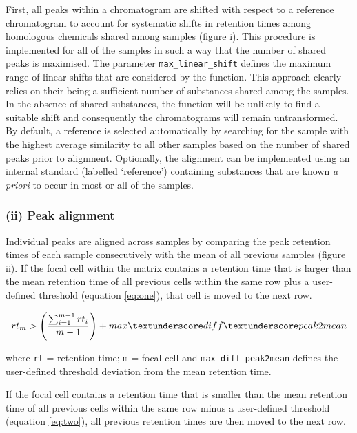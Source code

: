 First, all peaks within a chromatogram are shifted with respect to a
reference chromatogram to account for systematic shifts in retention
times among homologous chemicals shared among samples (figure
\href{figure:algorithm} i). This procedure is implemented for all of the
samples in such a way that the number of shared peaks is maximised. The
parameter \texttt{max\_linear\_shift} defines the maximum range of
linear shifts that are considered by the function. This approach clearly
relies on their being a sufficient number of substances shared among the
samples. In the absence of shared substances, the function will be
unlikely to find a suitable shift and consequently the chromatograms
will remain untransformed. By default, a reference is selected
automatically by searching for the sample with the highest average
similarity to all other samples based on the number of shared peaks
prior to alignment. Optionally, the alignment can be implemented using
an internal standard (labelled `reference') containing substances that
are known \emph{a priori} to occur in most or all of the samples.

\subsubsection{(ii) Peak alignment}\label{ii-peak-alignment}

Individual peaks are aligned across samples by comparing the peak
retention times of each sample consecutively with the mean of all
previous samples (figure \href{figure:algorithm} ii). If the focal cell
within the matrix contains a retention time that is larger than the mean
retention time of all previous cells within the same row plus a
user-defined threshold (equation \eqref{eq:one}), that cell is moved to
the next row.

\begin{equation}
\label{eq:one}
rt_{m} > \left(\frac{\sum_{i=1}^{m-1}rt_{i}}{m-1}\right) + max\textunderscore diff\textunderscore peak2mean
\end{equation}

where \texttt{rt} = retention time; \texttt{m} = focal cell and
\texttt{max\_diff\_peak2mean} defines the user-defined threshold
deviation from the mean retention time.

If the focal cell contains a retention time that is smaller than the
mean retention time of all previous cells within the same row minus a
user-defined threshold (equation \eqref{eq:two}), all previous retention
times are then moved to the next row.

